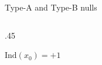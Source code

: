 \documentclass[final]{beamer}
\newlength{\onecolwid}
\newlength{\twocolwid}
\begin{document}
\begin{frame}[t]
\begin{columns}[t]
\begin{column}{\twocolwid}
\begin{columns}[t,totalwidth=\twocolwid]
\begin{column}{\onecolwid}
\begin{block}{Type-A and Type-B nulls}
\begin{columns}[t,totalwidth=\onecolwid]
\begin{column}{.45\onecolwid}
\begin{centering}
\begin{figure}
        \end{figure}
        \hfil$\mathrm{Ind}(x_0)=+1 $\hfil
    \end{centering}
    \end{column}
\end{columns}

\end{block}


\end{column} %

\end{columns} %


\end{column}
\end{columns}
\end{frame}
\end{document}
